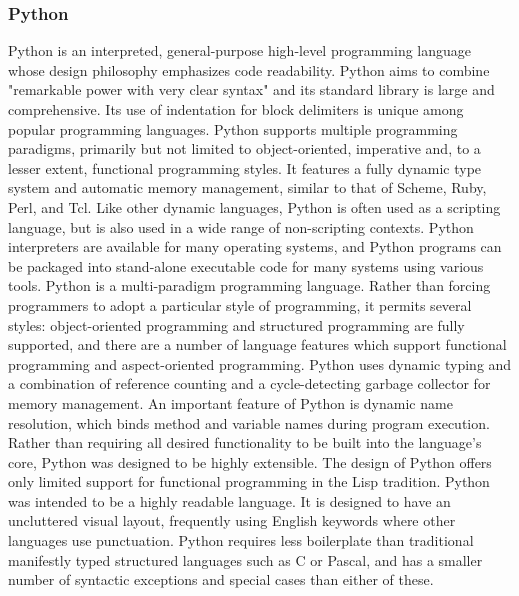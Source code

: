 \subsubsection*{Python}
Python is an interpreted, general-purpose high-level programming language whose design philosophy emphasizes code readability. Python aims to combine "remarkable power with very clear syntax" and its standard library is large and comprehensive. Its use of indentation for block delimiters is unique among popular programming languages.\newline
Python supports multiple programming paradigms, primarily but not limited to object-oriented, imperative and, to a lesser extent, functional programming styles. It features a fully dynamic type system and automatic memory management, similar to that of Scheme, Ruby, Perl, and Tcl. Like other dynamic languages, Python is often used as a scripting language, but is also used in a wide range of non-scripting contexts. Python interpreters are available for many operating systems, and Python programs can be packaged into stand-alone executable code for many systems using various tools. Python is a multi-paradigm programming language.
\newline
Rather than forcing programmers to adopt a particular style of programming, it permits several styles: object-oriented programming and structured programming are fully supported, and there are a number of language features which support functional programming and aspect-oriented programming.
\newline
Python uses dynamic typing and a combination of reference counting and a cycle-detecting garbage collector for memory management. An important feature of Python is dynamic name resolution, which binds method and variable names during program execution.
\newline
Rather than requiring all desired functionality to be built into the language's core, Python was designed to be highly extensible. The design of Python offers only limited support for functional programming in the Lisp tradition.
\newline
Python was intended to be a highly readable language. It is designed to have an uncluttered visual layout, frequently using English keywords where other languages use punctuation. Python requires less boilerplate than traditional manifestly typed structured languages such as C or Pascal, and has a smaller number of syntactic exceptions and special cases than either of these.
\newline
